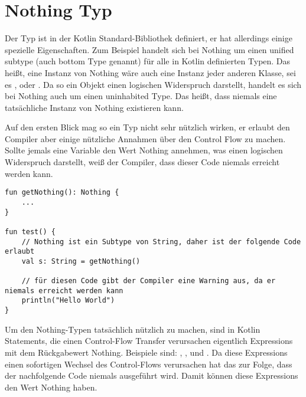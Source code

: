 
\section{Nothing Typ}\label{sec:nothing-type}

\renewcommand{\kapitelautor}{Autor: Marvin Kurka}

Der  Typ ist in der Kotlin Standard-Bibliothek definiert, er hat allerdings einige
spezielle Eigenschaften.
Zum Beispiel handelt sich bei Nothing um einen unified subtype (auch bottom Type genannt) für alle in Kotlin
definierten Typen.
Das heißt, eine Instanz von Nothing wäre auch eine Instanz jeder anderen Klasse, sei es ,
 oder .
Da so ein Objekt einen logischen Widerspruch darstellt, handelt es sich bei Nothing auch um einen uninhabited Type.
Das heißt, dass niemals eine tatsächliche Instanz von Nothing existieren kann.

Auf den ersten Blick mag so ein Typ nicht sehr nützlich wirken, er erlaubt den Compiler aber einige nützliche
Annahmen über den Control Flow zu machen.
Sollte jemals eine Variable den Wert Nothing annehmen, was einen logischen Widerspruch darstellt, weiß der Compiler,
dass dieser Code niemals erreicht werden kann.\cite{kspeCFG,kspecNothing}

\begin{verbatim}
fun getNothing(): Nothing {
    ...
}

fun test() {
    // Nothing ist ein Subtype von String, daher ist der folgende Code erlaubt
    val s: String = getNothing()

    // für diesen Code gibt der Compiler eine Warning aus, da er niemals erreicht werden kann
    println("Hello World")
}
\end{verbatim}

Um den Nothing-Typen tatsächlich nützlich zu machen, sind in Kotlin Statements, die einen Control-Flow Transfer
verursachen eigentlich Expressions mit dem Rückgabewert Nothing.
Beispiele sind: , ,  und .
Da diese Expressions einen sofortigen Wechsel des Control-Flows verursachen hat das zur Folge, dass der nachfolgende
Code niemals ausgeführt wird.
Damit können diese Expressions den Wert Nothing haben.\cite{kspeCFG}

